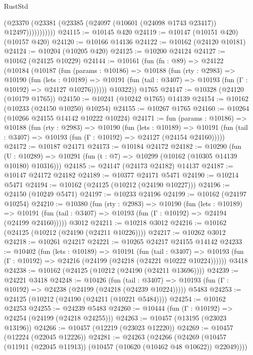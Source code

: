\begin{lexlean}{RustStd}
\begin{coremodule}
                  (@23370 (@23381 (@23385 (@24097 (@10601 (@24098 @1743 @23417)) @12497)))))))))))
@24115 := @10145 @420
@24119 := @10147 (@10151 @420) (@10157 @420)
@24120 := @10166 @14136
@24122 := @10162 (@24120 @10181)
@24124 := @10204 (@10205 @420)
@24125 := @10200 @24124
@24127 := @10162 (@24125 @10229)
@24144 := @10161
    (fun (fn : @89) =>
    @24122
      (@10184
        (@10187
          (fun (params : @10186) =>
          @10188
            (fun (rty : @2983) =>
            @10190
              (fun (lets : @10189) =>
              @10191 (fun (tail : @3407) => @10193 (fun (Γ : @10192) => @24127 @10276))))))
        @10322))
    @1765
@24147 := @10328 (@24120 (@10179 @1765))
@24150 := @10241 (@10242 @1765) @14139
@24154 := @10162 (@10233 (@24150 @10250) @10254)
@24155 := @10267 @1765
@24160 := @10264 (@10266 @24155 @14142 @10222 @10224)
@24171 := fun (params : @10186) =>
  @10188
    (fun (rty : @2983) =>
    @10190
      (fun (lets : @10189) =>
      @10191 (fun (tail : @3407) => @10193 (fun (Γ : @10192) => @24127 (@24154 @24160)))))
@24172 := @10187 @24171
@24173 := @10184 @24172
@24182 := @10290
    (fun (U : @10289) => @10291 (fun (t : @7) => @10299 (@10162 (@10305 @14139 @10180) @10316)))
@24185 := @24147 (@24173 @24182) @14137
@24187 := @10147 @24172 @24182
@24189 := @10377 @24171 @5471
@24190 := @10214 @5471
@24194 := @10162 (@24125 (@10212 (@24190 @10227)))
@24196 := @24150 (@10249 @5471)
@24197 := @10233 @24196
@24199 := @10162 (@24197 @10254)
@24210 := @10380
    (fun (rty : @2983) =>
    @10190
      (fun (lets : @10189) =>
      @10191 (fun (tail : @3407) => @10193 (fun (Γ : @10192) => @24194 (@24199 @24160)))))
    @3012
@24211 := @10218 @3012
@24216 := @10162 (@24125 (@10212 (@24190 (@24211 @10226))))
@24217 := @10262 @3012
@24218 := @10261 @24217
@24221 := @10265 @24217 @24155 @14142
@24233 := @10402
    (fun (lets : @10189) =>
    @10191
      (fun (tail : @3407) =>
      @10193 (fun (Γ : @10192) => @24216 (@24199 (@24218 (@24221 @10222 @10224))))))
    @3418
@24238 := @10162 (@24125 (@10212 (@24190 (@24211 @13696))))
@24239 := @24221 @3418
@24248 := @10426
    (fun (tail : @3407) => @10193 (fun (Γ : @10192) => @24238 (@24199 (@24218 (@24239 @10224)))))
    @5483
@24253 := @24125 (@10212 (@24190 (@24211 (@10221 @5484))))
@24254 := @10162 @24253
@24255 := @24239 @5483
@24260 := @10444 (fun (Γ : @10192) => @24254 (@24199 (@24218 @24255)))
@24263 := @10457 (@13195 (@23023 @13196))
@24266 := @10457 (@12219 (@23023 @12220))
@24269 := @10457 (@12224 (@22045 @12226))
@24281 := @24263
    (@24266 (@24269 (@10457 (@11911 (@22045 @11913)) (@10457 (@10620 (@10462 @48 @10622)) @22049))))

\end{coremodule}
\end{lexlean}
